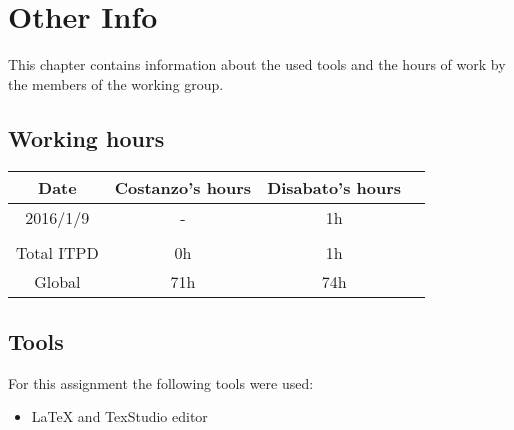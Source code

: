 \documentclass[\mainpath/main]{subfiles}
\begin{document}
\chapter{Other Info}
\label{OtherInfo}

\setmyfancystyle

This chapter contains information about the used tools and the hours of work by the members of the working group.

\section{Working hours}
\begin{table}[h!]
	\centering
\begin{tabular}{cccc}
\hline
Date     	& Costanzo's hours & Disabato's hours  & \\ \hline
2016/1/9 	& -			  	   & 1h 			   & \\ \hline

\\
Total ITPD  & 0h 		 	   & 1h 			   & \\ \hline
Global 	    & 71h 		 	   & 74h 			   & \\ \hline

\end{tabular}
\end{table}

\section{Tools}
For this assignment the following tools were used:
\begin{itemize}
	\item \LaTeX{} and TexStudio editor
\end{itemize}
\end{document}
